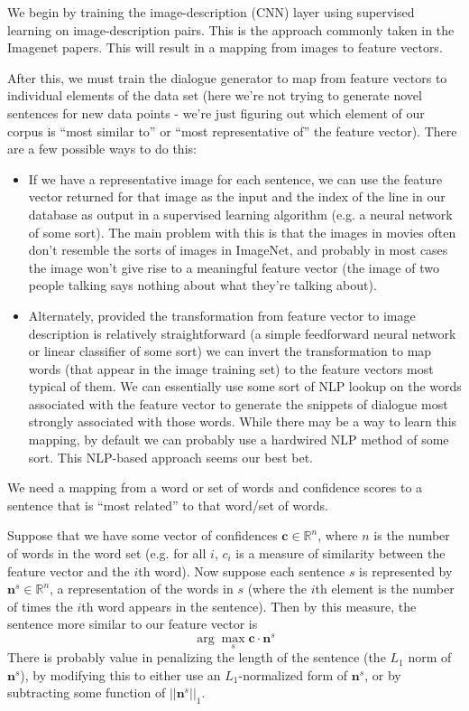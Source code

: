 \documentclass{article}
\begin{document}
We begin by training the image-description (CNN) layer using supervised learning on image-description pairs.   This is the approach commonly taken in the Imagenet papers.  This will result in a mapping from images to feature vectors.

After this, we must train the dialogue generator to map from feature vectors to individual elements of the data set (here we're not trying to generate novel sentences for new data points - we're just figuring out which element of our corpus is ``most similar to'' or ``most representative of'' the feature vector).  There are a few possible ways to do this:

\begin{itemize}
\item If we have a representative image for each sentence, we can use the feature vector returned for that image as the input and the index of the line in our database as output in a supervised learning algorithm (e.g. a neural network of some sort).  The main problem with this is that the images in movies often don't resemble the sorts of images in ImageNet, and probably in most cases the image won't give rise to a meaningful feature vector (the image of two people talking says nothing about what they're talking about).
\item Alternately, provided the transformation from feature vector to image description is relatively straightforward (a simple feedforward neural network or linear classifier of some sort) we can invert the transformation to map words (that appear in the image training set) to the feature vectors most typical of them.  We can essentially use some sort of NLP lookup on the words associated with the feature vector to generate the snippets of dialogue most strongly associated with those words.  While there may be a way to learn this mapping, by default we can probably use a hardwired NLP method of some sort.  This NLP-based approach seems our best bet.
\end{itemize}

We need a mapping from a word or set of words and confidence scores to a sentence that is ``most related'' to that word/set of words.

Suppose that we have some vector of confidences $\mathbf{c} \in \mathbb{R}^n$, where $n$ is the number of words in the word set (e.g. for all $i$, $c_i$ is a measure of similarity between the feature vector and the $i$th word).  Now suppose each sentence $s$ is represented by $\mathbf{n}^s \in \mathbb{R}^n$, a representation of the words in $s$ (where the $i$th element is the number of times the $i$th word appears in the sentence).  Then by this measure, the sentence more similar to our feature vector is
\begin{equation}
\arg\max_{s} \mathbf{c} \cdot \mathbf{n}^s
\end{equation}
There is probably value in penalizing the length of the sentence (the $L_1$ norm of $\mathbf{n}^s$), by modifying this to either use an $L_1$-normalized form of $\mathbf{n}^s$, or by subtracting some function of $||\mathbf{n}^s||_1$.
\end{document}
